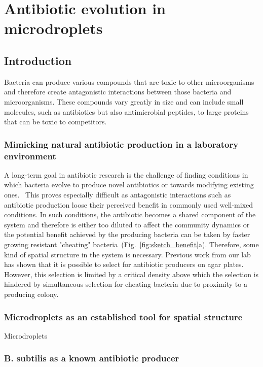 \part{Antibiotic evolution in microdroplets}
\chapter{Introduction}
\label{chap:droplets_intro}

Bacteria can produce various compounds that are toxic to other microorganisms and therefore create antagonistic interactions between those bacteria and microorganisms. These compounds vary greatly in size and can include small molecules, such as antibiotics but also antimicrobial peptides, to large proteins that can be toxic to competitors.

\section{Mimicking natural antibiotic production in a laboratory environment}
A long-term goal in antibiotic research is the challenge of finding conditions in which bacteria evolve to produce novel antibiotics or towards modifying existing ones.~\cite{Charusanti2012-uy} This proves especially difficult as antagonistic interactions such as antibiotic production loose their perceived benefit in commonly used well-mixed conditions. In such conditions, the antibiotic becomes a shared component of the system and therefore is either too diluted to affect the community dynamics or the potential benefit achieved by the producing bacteria can be taken by faster growing resistant "cheating" bacteria~(Fig.~\ref{fig:sketch_benefit}a). Therefore, some kind of spatial structure in the system is necessary. Previous work from our lab~\cite{Ylaine} has shown that it is possible to select for antibiotic producers on agar plates. However, this selection is limited by a critical density above which the selection is hindered by simultaneous selection for cheating bacteria due to proximity to a producing colony.

\section{Microdroplets as an established tool for spatial structure}
Microdroplets 

\section{B. subtilis as a known antibiotic producer}

